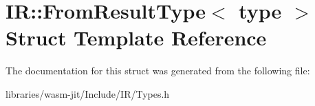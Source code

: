 \hypertarget{struct_i_r_1_1_from_result_type}{}\section{IR\+:\+:From\+Result\+Type$<$ type $>$ Struct Template Reference}
\label{struct_i_r_1_1_from_result_type}


The documentation for this struct was generated from the following file\+:\begin{DoxyCompactItemize}
\item 
libraries/wasm-\/jit/\+Include/\+I\+R/Types.\+h\end{DoxyCompactItemize}
